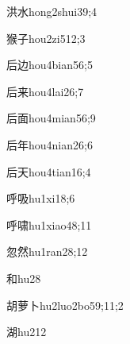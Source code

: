 \begin{verbete}{洪水}{hong2shui3}{9;4}
\end{verbete}

\begin{verbete}{猴子}{hou2zi5}{12;3}
\end{verbete}

\begin{verbete}{后边}{hou4bian5}{6;5}
\end{verbete}

\begin{verbete}{后来}{hou4lai2}{6;7}
\end{verbete}

\begin{verbete}{后面}{hou4mian5}{6;9}
\end{verbete}

\begin{verbete}{后年}{hou4nian2}{6;6}
\end{verbete}

\begin{verbete}{后天}{hou4tian1}{6;4}
\end{verbete}

\begin{verbete}{呼吸}{hu1xi1}{8;6}
\end{verbete}

\begin{verbete}{呼啸}{hu1xiao4}{8;11}
\end{verbete}

\begin{verbete}{忽然}{hu1ran2}{8;12}
\end{verbete}

\begin{verbete}{和}{hu2}{8}
\end{verbete}

\begin{verbete}{胡萝卜}{hu2luo2bo5}{9;11;2}
\end{verbete}

\begin{verbete}{湖}{hu2}{12}
\end{verbete}

